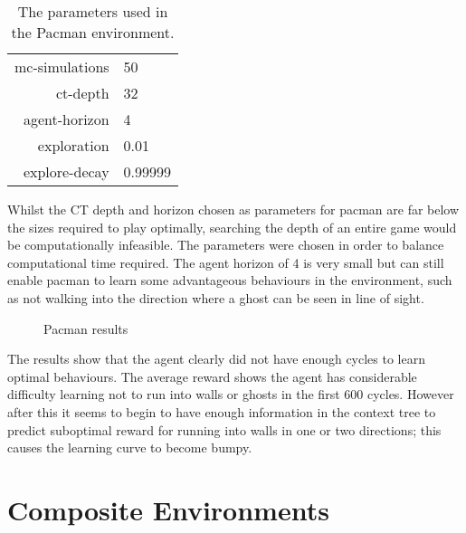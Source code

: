 \documentclass[pdftex,twoside,a4paper]{report}
\begin{document}
\begin{table}[h]
\begin{center}
\begin{tabular}{| r | l | }
\hline
mc-simulations & 50\\
ct-depth & 32\\
agent-horizon & 4\\
exploration & 0.01\\
explore-decay & 0.99999\\
\hline
\end{tabular}
\caption{The parameters used in the Pacman environment.}
\end{center}
\end{table}

Whilst the CT depth and horizon chosen as parameters for pacman are far below the sizes required to play optimally, searching the depth of an entire game would be computationally infeasible. The parameters were chosen in order to balance computational time required. The agent horizon of 4 is very small but can still enable pacman to learn some advantageous behaviours in the environment, such as not walking into the direction where a ghost can be seen in line of sight.

\begin{figure}
  \begin{center}
  \end{center}
  \caption{Pacman results}
  \label{fig:pacman_results}
\end{figure}

The results show that the agent clearly did not have enough cycles to learn optimal behaviours. The average reward shows the agent has considerable difficulty learning not to run into walls or ghosts in the first 600 cycles. However after this it seems to begin to have enough information in the context tree to predict suboptimal reward for running into walls in one or two directions; this causes the learning curve to become bumpy.

\section{Composite Environments}
\end{document}
